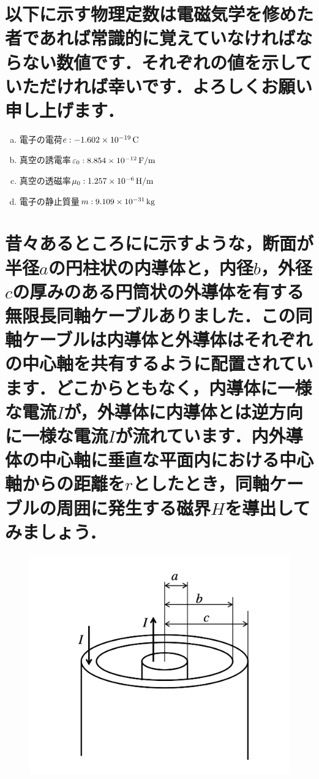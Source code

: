 \documentclass[dvipdfmx]{ujarticle}
\begin{document}
\section{以下に示す物理定数は電磁気学を修めた者であれば常識的に覚えていなければならない数値です．それぞれの値を示していただければ幸いです．よろしくお願い申し上げます．}
\begin{enumerate}[(a)]
	\item 電子の電荷$e:-1.602 \times 10^{-19}\,\rm{C}$
	\item 真空の誘電率$\varepsilon_{0}:8.854 \times 10^{-12}\,\rm{F/m}$
	\item 真空の透磁率$\mu_{0}:1.257 \times 10^{-6}\,\rm{H/m}$
	\item 電子の静止質量$m:9.109\times 10^{-31}\,\rm{kg}$
\end{enumerate}

\section{昔々あるところにに示すような，断面が半径$a$の円柱状の内導体と，内径$b$，外径$c$の厚みのある円筒状の外導体を有する無限長同軸ケーブルありました．この同軸ケーブルは内導体と外導体はそれぞれの中心軸を共有するように配置されています．どこからともなく，内導体に一様な電流$I$が，外導体に内導体とは逆方向に一様な電流$I$が流れています．内外導体の中心軸に垂直な平面内における中心軸からの距離を$r$としたとき，同軸ケーブルの周囲に発生する磁界$H$を導出してみましょう．}

\begin{figure}[h]
	\centering
	\includegraphics[scale=0.35]{./fig/R03_fig1.png}
	\caption{}
	\label{fig:1}
\end{figure}
\end{document}
